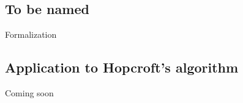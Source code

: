 \documentclass{beamer}
\theoremstyle{definition}
\begin{document}
\subsection{To be named}

\begin{frame}
    Formalization
\end{frame}

\subsection{Application to Hopcroft's algorithm}

\begin{frame}
    Coming soon
\end{frame}
\end{document}
